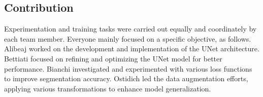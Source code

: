 \documentclass[11pt]{article}
\begin{document}
\begin{multicols}{2}
        \subsection{Contribution}

        Experimentation and training tasks were carried out equally and coordinately by each team member.
        Everyone mainly focused on a specific objective, as follows.
        Alibeaj worked on the development and implementation of the UNet architecture.
        Bettiati focused on refining and optimizing the UNet model for better performance.
        Bianchi investigated and experimented with various loss functions to improve segmentation accuracy.
        Ostidich led the data augmentation efforts, applying various transformations to enhance model generalization.

        
        

    \end{multicols}
\end{document}
